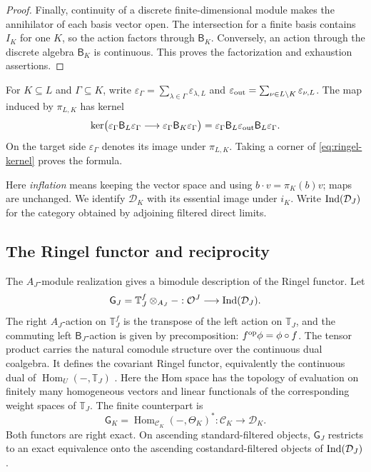 \documentclass[11pt,reqno]{amsart}
\newcommand{\OO}{\mathcal O}\newcommand{\CC}{\mathscr C}\newcommand{\RR}{\mathcal R}\newcommand{\DD}{\mathcal D}
\newcommand{\Hom}{\operatorname{Hom}}\newcommand{\End}{\operatorname{End}}\newcommand{\Ext}{\operatorname{Ext}}
\newcommand{\BJ}{\mathsf B_J}\newcommand{\BK}{\mathsf B_K}\newcommand{\TJ}{\mathbb T_J}\newcommand{\GK}{\mathsf G_K}\newcommand{\GJ}{\mathsf G_J}
\theoremstyle{definition}
\theoremstyle{remark}
\numberwithin{equation}{section}
\begin{document}
\begin{proof}
Finally, continuity of a discrete finite-dimensional module makes the
annihilator of each basis vector open. The intersection for a finite
basis contains $I_K$ for one $K$, so the action factors through $\BK$.
Conversely, an action through the discrete algebra $\BK$ is continuous.
This proves the factorization and exhaustion assertions.
\end{proof}

For $K\subseteq L$ and
$\Gamma\subseteq K$, write
$\varepsilon_\Gamma=\sum_{\lambda\in\Gamma}\varepsilon_{\lambda,L}$
and $\varepsilon_{\rm out}=\sum_{\nu\in L\setminus K}
\varepsilon_{\nu,L}$. The map induced by $\pi_{L,K}$ has kernel
\begin{equation}\label{eq:family-kernel}
 \ker\bigl(\varepsilon_\Gamma\mathsf B_L\varepsilon_\Gamma
       \longrightarrow\varepsilon_\Gamma\BK\varepsilon_\Gamma\bigr)
 =\varepsilon_\Gamma\mathsf B_L\varepsilon_{\rm out}
             \mathsf B_L\varepsilon_\Gamma.
\end{equation}
On the target side $\varepsilon_\Gamma$ denotes its image under
$\pi_{L,K}$. Taking a corner of \eqref{eq:ringel-kernel} proves the formula.

Here \emph{inflation} means keeping the vector space and using
$b\cdot v=\pi_K(b)v$; maps are unchanged. We identify $\DD_K$ with
its essential image under $i_K$. Write $\Ind(\DD_J)$ for the
category obtained by adjoining filtered direct limits.

\subsection{The Ringel functor and reciprocity}

The $A_J$-module realization gives a bimodule description of the
Ringel functor. Let
\[
 \GJ=\TJ^f\otimes_{A_J}-:
       \OO^J\longrightarrow\Ind(\DD_J).
\]
The right $A_J$-action on $\TJ^f$ is the transpose of the left action on
$\TJ$, and the commuting left $\BJ$-action is given by precomposition:
$f^{\mathrm{op}}\phi=\phi\circ f$. The tensor product carries the natural
comodule structure over the continuous dual coalgebra. It defines the
covariant Ringel functor, equivalently the continuous dual of
$\Hom_U(-,\TJ)$ \cite[Lemma~2.11]{BS}. Here the Hom space has
the topology of evaluation on finitely many homogeneous vectors
and linear functionals of the corresponding weight spaces of $\TJ$.
The finite counterpart is
\[
 \GK=\Hom_{\CC_K}(-,\Theta_K)^*:
             \CC_K\longrightarrow\DD_K.
\]
Both functors are right exact. On ascending standard-filtered objects,
$\GJ$ restricts to an exact equivalence onto the ascending
costandard-filtered objects of $\Ind(\DD_J)$
\cite[Theorem~4.27]{BS}.
\end{document}
